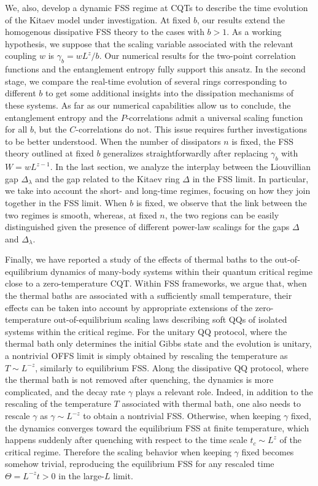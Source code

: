 We, also, develop a dynamic FSS regime at CQTs to describe the time evolution of the Kitaev model under investigation. At fixed $b$, our results extend the homogenous dissipative FSS theory to the cases with $b>1$. As a working hypothesis, we suppose that the scaling variable associated with the relevant coupling $w$ is $\gamma_b=wL^{z}/b$. Our numerical results for the two-point correlation functions and the entanglement entropy fully support this ansatz. In the second stage, we compare the real-time evolution of several rings corresponding to different $b$ to get some additional insights into the dissipation mechanisms of these systems.  As far as our numerical capabilities allow us to conclude, the entanglement entropy and the $P$-correlations admit a universal scaling function for all $b$, but the $C$-correlations do not. This issue requires further investigations to be better understood. When the number of dissipators $n$ is fixed, the FSS theory outlined at fixed $b$ generalizes straightforwardly after replacing $\gamma_b$ with $W=wL^{z-1}$. In the last section, we analyze the interplay between the Liouvillian gap $\Delta_\lambda$ and the gap related to the Kitaev ring $\Delta$ in the FSS limit. In particular, we take into account the short- and long-time regimes, focusing on how they join together in the FSS limit. When $b$ is fixed, we observe that the link between the two regimes is smooth, whereas, at fixed $n$, the two regions can be easily distinguished given the presence of different power-law scalings for the gaps $\Delta$ and $\Delta_\lambda$.  


Finally, we have reported a study of the effects of thermal
baths to the out-of-equilibrium dynamics of many-body
systems within their quantum critical regime close to a
zero-temperature CQT.
Within FSS frameworks, we argue that, when the thermal baths are
associated with a sufficiently small temperature, their effects can be
taken into account by appropriate extensions of the zero-temperature
out-of-equilibrium scaling laws describing soft QQs of isolated
systems within the critical regime.  For the unitary QQ protocol,
where the thermal bath only determines the initial Gibbs state and the
evolution is unitary, a nontrivial OFFS limit is simply obtained by
rescaling the temperature as $T\sim L^{-z}$, similarly to equilibrium
FSS.  Along the dissipative QQ protocol, where the thermal bath is not
removed after quenching, the dynamics is more complicated, and the
decay rate $\gamma$ plays a relevant role.  Indeed, in addition to the
rescaling of the temperature $T$ associated with thermal bath, one
also needs to rescale $\gamma$ as $\gamma\sim L^{-z}$ to obtain a
nontrivial FSS. Otherwise, when keeping $\gamma$ fixed, the dynamics
converges toward the equilibrium FSS at finite temperature, which
happens suddenly after quenching with respect to the time scale
$t_c\sim L^z$ of the critical regime.  Therefore the scaling behavior
when keeping $\gamma$ fixed becomes somehow trivial, reproducing the
equilibrium FSS for any rescaled time $\Theta = L^{-z} t >0$ in the
large-$L$ limit.



